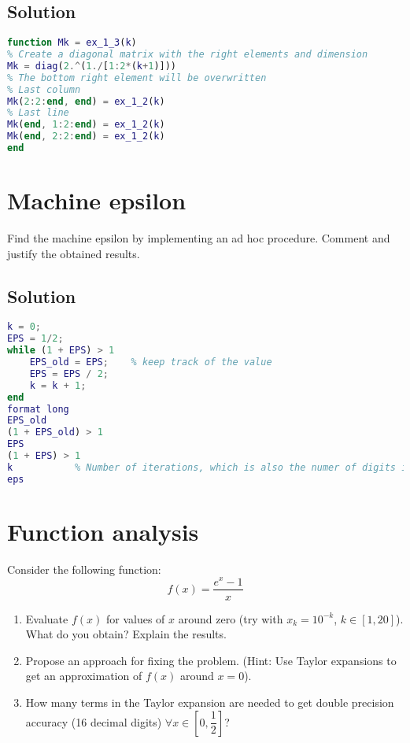 \documentclass[12pt, a4paper]{report}
\newtheorem[style=M,bodystyle=\normalfont]{theorem}{Theorem}
\newtheorem[style=M,bodystyle=\normalfont]{corollary}{Corollary}
\newtheorem[style=M,bodystyle=\normalfont]{lemma}{Lemma}
\newtheorem[style=M,bodystyle=\normalfont]{definition}{Definition}
\begin{document}
    \subsection*{Solution}
        \begin{lstlisting}[language=Matlab]
function Mk = ex_1_3(k)
% Create a diagonal matrix with the right elements and dimension
Mk = diag(2.^(1./[1:2*(k+1)]))
% The bottom right element will be overwritten
% Last column
Mk(2:2:end, end) = ex_1_2(k)
% Last line
Mk(end, 1:2:end) = ex_1_2(k)
Mk(end, 2:2:end) = ex_1_2(k)
end
        \end{lstlisting}

    \newpage

    \section{Machine epsilon}
        Find the machine epsilon by implementing an ad hoc procedure. Comment and justify the obtained results.
    \subsection*{Solution}
        \begin{lstlisting}[language=Matlab]
k = 0;
EPS = 1/2;
while (1 + EPS) > 1
    EPS_old = EPS;    % keep track of the value
    EPS = EPS / 2;
    k = k + 1;
end
format long
EPS_old		
(1 + EPS_old) > 1
EPS
(1 + EPS) > 1
k			% Number of iterations, which is also the numer of digits in the mantissa, according to the standard
eps			 
        \end{lstlisting}

    \newpage

    \section{Function analysis}
        Consider the following function:
        \[f(x)=\dfrac{e^x-1}{x}\]
        \begin{enumerate}
            \item Evaluate $f(x)$ for values of $x$ around zero (try with $x_k = 10^{-k}$, $k \in [1, 20]$). What do you obtain? Explain the results.
            \item Propose an approach for fixing the problem. (Hint: Use Taylor expansions to get an approximation of $f(x)$ around $x = 0$). 
            \item How many terms in the Taylor expansion are needed to get double precision accuracy (16 decimal digits) $\forall x \in \left[0, \dfrac{1}{2}\right]$?
        \end{enumerate}
\end{document}
